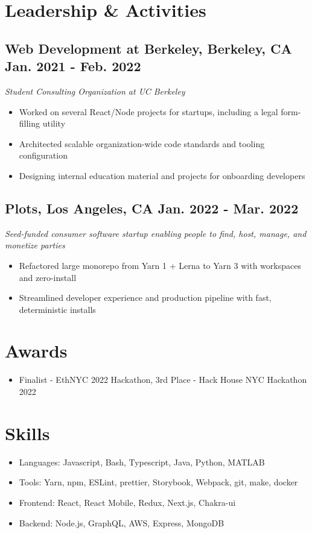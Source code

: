 \documentclass{article}
\begin{document}
	\section{Leadership \& Activities}

	\subsection{
		\textbf{Web Development at Berkeley}, Berkeley, CA
		{\hspace{\fill}\bfseries Jan. 2021 - Feb. 2022}
	}
	{\itshape Student Consulting Organization at UC Berkeley}
	\begin{itemize}
		\item Worked on several React/Node projects for startups, including a legal form-filling utility
		\item Architected scalable organization-wide code standards and tooling configuration
		\item Designing internal education material and projects for onboarding developers
	\end{itemize}

	\vspace{14pt}

	\subsection{
		\textbf{Plots}, Los Angeles, CA
		{\hspace{\fill}\bfseries Jan. 2022 - Mar. 2022}
	}
	{\itshape Seed-funded consumer software startup enabling people to find, host, manage, and monetize parties}
    \begin{itemize}
		\item Refactored large monorepo from Yarn 1 + Lerna to Yarn 3 with workspaces and zero-install
		\item Streamlined developer experience and production pipeline with fast, deterministic installs
	\end{itemize}

	\section{Awards}
	\vspace{3pt}
	\begin{itemize}
		\item Finalist - EthNYC 2022 Hackathon, 3rd Place - Hack House NYC Hackathon 2022
	\end{itemize}

	\section{Skills}
	\vspace{3pt}
	\begin{itemize}
		\item Languages: Javascript, Bash, Typescript, Java, Python, MATLAB
		\item Tools: Yarn, npm, ESLint, prettier, Storybook, Webpack, git, make, docker
		\item Frontend: React, React Mobile, Redux, Next.js, Chakra-ui
		\item Backend: Node.js, GraphQL, AWS, Express, MongoDB
	\end{itemize}
\end{document}
